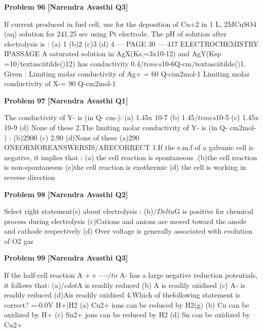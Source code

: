 \begin{problembox}
\textbf{Problem 96} \hfill \textbf{[Narendra Avasthi Q3]}
\label{q:ext-narendra_avasthi_all_questions-96}

If current produced in fuel cell, use for the deposition of Cu+2 in 1 L, 2MCuSO4 (aq) solution
for 241.25 sec using Pt electrode. The pH of solution after electrolysis is :
(a) 1
(b)2
(c)3
(d) 4
--- PAGE 30 ---
417
ELECTROCHEMISTRY
IPASSAGE
A saturated solution in AgX(Ks,=3x10-12) and AgY(Ksp =10/textasciitilde()12) has conductivity
0.4$/times$10-6Q-cm/textasciitilde()1.
Given : Limiting molar conductivity of Ag+ = 60 Q-cim$2$mol-1
Limiting molar conductivity of X-= 90 Q-cm$2$mol-1
\end{problembox}

\begin{problembox}
\textbf{Problem 97} \hfill \textbf{[Narendra Avasthi Q1]}
\label{q:ext-narendra_avasthi_all_questions-97}

The conductivity of Y- is (in Q- cm-):
(a) 1.45x 10-7
(b) 1.45$/times$10-5
(c) 1.45x 10-9
(d) None of these
2.The limiting molar conductivity of Y- is (in Q- cm$2$mol- ) :
(b)2900
(c) 2.90
(d)None of these
(a)290
ONEORMOREANSWERSIS/ARECORRECT
1.If the e.m.f of a galvanic cell is negative, it implies that :
(a) the cell reaction is spontaneous
.(b)the cell reaction is non-spontaneous
(c)the cell reaction is exothermic
(d) the cell is working in reverse direction
\end{problembox}

\begin{problembox}
\textbf{Problem 98} \hfill \textbf{[Narendra Avasthi Q2]}
\label{q:ext-narendra_avasthi_all_questions-98}

Select right statement(s) about electrolysis :
(b)$/Delta$G is positive for chemical process during electrolysis
(c)Cations and anions are moved toward the anode and cathode respectively
(d) Over voltage is generally associated with evolution of O2 gas
\end{problembox}

\begin{problembox}
\textbf{Problem 99} \hfill \textbf{[Narendra Avasthi Q3]}
\label{q:ext-narendra_avasthi_all_questions-99}

If the half-cell reaction A + e ----$/to$ A- has a large negative reduction potentials, it follows
that:
(a)$/cdot$A is readily reduced
(b) A is readily oxidised
(c) A- is readily reduced
(d)Ais readily oxidised
4.Which of thefollowing statement is correct?
=-0.0V
H+|H2
(a) Cu2+ ions can be reduced by H2(g)
(b) Cu can be oxidized by H+
(c) Sn2+ jons can be reduced by H2
(d) Sn can be oxidized by Cu2+
\end{problembox}

